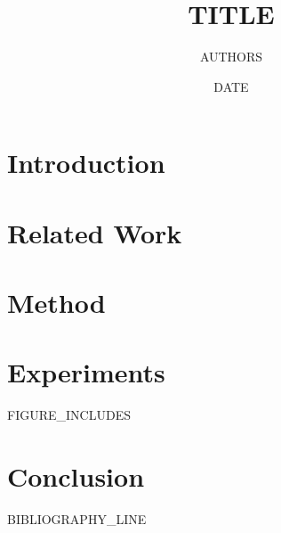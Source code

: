 \documentclass[10pt,letterpaper]{article}
\title{ {{TITLE}} }
\author{ {{AUTHORS}} }
\date{ {{DATE}} }
\begin{document}
\maketitle

\begin{abstract}
\end{abstract}

\section{Introduction}

\section{Related Work}

\section{Method}

\section{Experiments}

{{FIGURE_INCLUDES}}

\section{Conclusion}

{{BIBLIOGRAPHY_LINE}}
\end{document}

